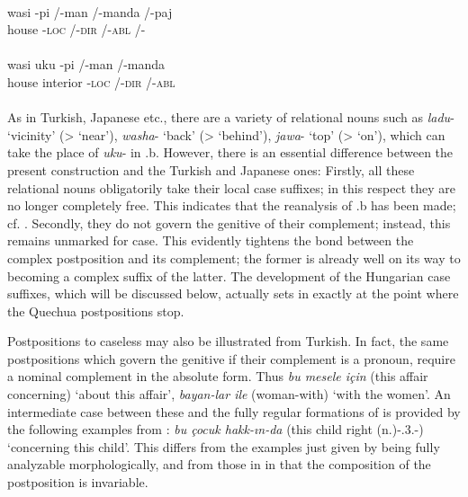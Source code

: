 \ea\label{ex:E56}
 \\
 \ea
 \gll  wasi  {}-pi  /-man  /-manda  /-paj\\
  house  {}-\textsc{loc}  /-\textsc{dir}  /-\textsc{abl}  /-\glgen\\
\\
\ex
\gll  wasi  uku  {}-pi  /-man  /-manda\\
house  interior  {}-\textsc{loc}  /-\textsc{dir}  /-\textsc{abl}\\
\\
\z
\z
\noindent As in Turkish, Japanese etc., there are a variety of relational nouns such as \textit{ladu}{}- ‘vicinity’ ({\textgreater} ‘near’), \textit{washa}{}- ‘back’ ({\textgreater} ‘behind’), \textit{jawa}{}- ‘top’ ({\textgreater} ‘on’), which can take the place of \textit{uku}{}- in .b. However, there is an essential difference between the present construction and the Turkish and Japanese ones: Firstly, all these relational nouns obligatorily take their local case suffixes; in this respect they are no longer completely free. This indicates that the reanalysis of .b has been made; cf. \citet[120]{Cole1982}. Secondly, they do not govern the genitive of their complement; instead, this remains unmarked for case. This evidently tightens the bond between the complex postposition and its complement; the former is already well on its way to becoming a complex suffix of the latter. The development of the Hungarian case suffixes, which will be discussed below, actually sets in exactly at the point where the Quechua postpositions stop.

Postpositions to caseless \nps may also be illustrated from Turkish. In fact, the same postpositions which govern the genitive if their complement is a pronoun, require a nominal complement in the absolute form. Thus \textit{bu mesele için} (this affair concerning) ‘about this affair’, \textit{bayan-lar ile} (woman-\glpl with) ‘with the women’. An intermediate case between these and the fully regular formations of  is provided by the following examples from \citet[30]{Kahr1975}: \textit{bu çocuk hakk-ın-da} (this child right (n.)-\glposs.3.\glsg-\glloc) ‘concerning this child’. This differs from the examples just given by being fully analyzable morphologically, and from those in  in that the composition of the postposition is invariable.


